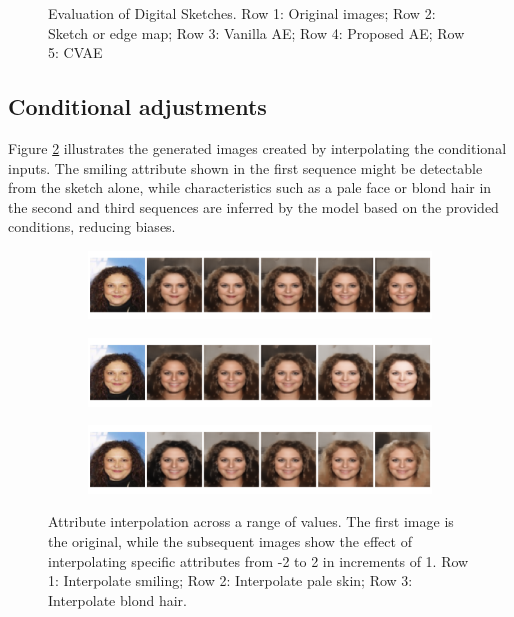 \documentclass{IEEEcsmag}
\begin{document}
\begin{figure}[ht]
    \caption{Evaluation of Digital Sketches. Row 1: Original images; Row 2: Sketch or edge map; Row 3: Vanilla AE; Row 4: Proposed AE; Row 5: CVAE}
    \label{fig:DigitalSketchComparison}
\end{figure}

\subsection{Conditional adjustments}
\label{subsec:conditionalAdjustments}

Figure \ref{fig:interpolation} illustrates the generated images created by interpolating the conditional inputs. The smiling attribute shown in the first sequence might be detectable from the sketch alone, while characteristics such as a pale face or blond hair in the second and third sequences are inferred by the model based on the provided conditions, reducing biases.

\begin{figure}[ht]
    \centering
    \begin{subfigure}{0.8\textwidth}
        \includegraphics[width=\linewidth]{images/CelebA/5/Smiling/interpolation_13.png}
    \end{subfigure}
    \begin{subfigure}{0.8\textwidth}
        \includegraphics[width=\linewidth]{images/CelebA/5/Pale_Skin/interpolation_13.png}
    \end{subfigure}
    \begin{subfigure}{0.8\textwidth}
        \includegraphics[width=\linewidth]{images/CelebA/5/Blond_Hair/interpolation_13.png}
    \end{subfigure}
    \caption{Attribute interpolation across a range of values. The first image is the original, while the subsequent images show the effect of interpolating specific attributes from -2 to 2 in increments of 1. Row 1: Interpolate smiling; Row 2: Interpolate pale skin; Row 3: Interpolate blond hair.}
    \label{fig:interpolation}
\end{figure}
\end{document}
